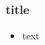 \begin{frame}\frametitle{title}
\begin{itemize}
    \setlength{\parskip}{10pt}
    \item text
\end{itemize}
\end{frame}
